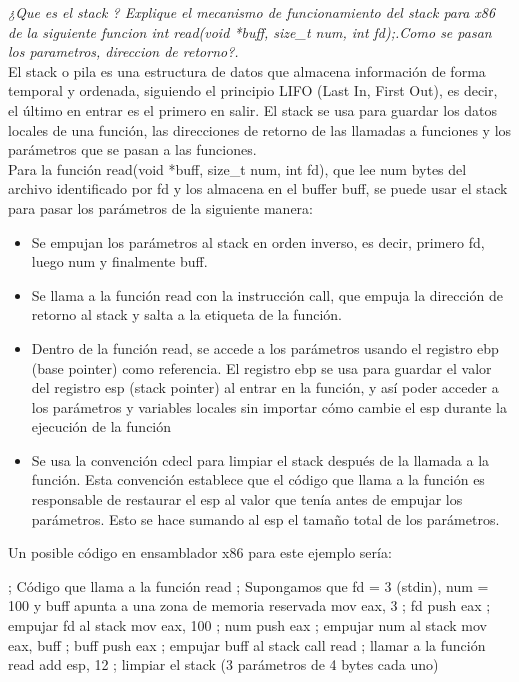 \documentclass[../main.tex]{subfiles}
\begin{document}
    \begin{exercise}
        \textit{¿Que es el stack ? Explique el mecanismo de funcionamiento del stack para x86 de la siguiente funcion int read(void *buff, size\_t num, int fd);.Como se pasan los parametros, direccion de retorno?.}\\

            El stack o pila es una estructura de datos que almacena información de forma temporal y ordenada, siguiendo el principio LIFO (Last In, First Out), es decir, el último en entrar es el primero en salir. El stack se usa para guardar los datos locales de una función, las direcciones de retorno de las llamadas a funciones y los parámetros que se pasan a las funciones.\\
            
            Para la función read(void *buff, size\_t num, int fd), que lee num bytes del archivo identificado por fd y los almacena en el buffer buff, se puede usar el stack para pasar los parámetros de la siguiente manera:
            \begin{itemize}
                \item Se empujan los parámetros al stack en orden inverso, es decir, primero fd, luego num y finalmente buff.
                \item Se llama a la función read con la instrucción call, que empuja la dirección de retorno al stack y salta a la etiqueta de la función.
                \item Dentro de la función read, se accede a los parámetros usando el registro ebp (base pointer) como referencia. El registro ebp se usa para guardar el valor del registro esp (stack pointer) al entrar en la función, y así poder acceder a los parámetros y variables locales sin importar cómo cambie el esp durante la ejecución de la función
                \item Se usa la convención cdecl para limpiar el stack después de la llamada a la función. Esta convención establece que el código que llama a la función es responsable de restaurar el esp al valor que tenía antes de empujar los parámetros. Esto se hace sumando al esp el tamaño total de los parámetros.
            \end{itemize}
            
            Un posible código en ensamblador x86 para este ejemplo sería:
            
            ; Código que llama a la función read ; Supongamos que fd = 3 (stdin), num = 100 y buff apunta a una zona de memoria reservada mov eax, 3 ; fd push eax ; empujar fd al stack mov eax, 100 ; num push eax ; empujar num al stack mov eax, buff ; buff push eax ; empujar buff al stack call read ; llamar a la función read add esp, 12 ; limpiar el stack (3 parámetros de 4 bytes cada uno)
            

\end{exercise}
\end{document}
